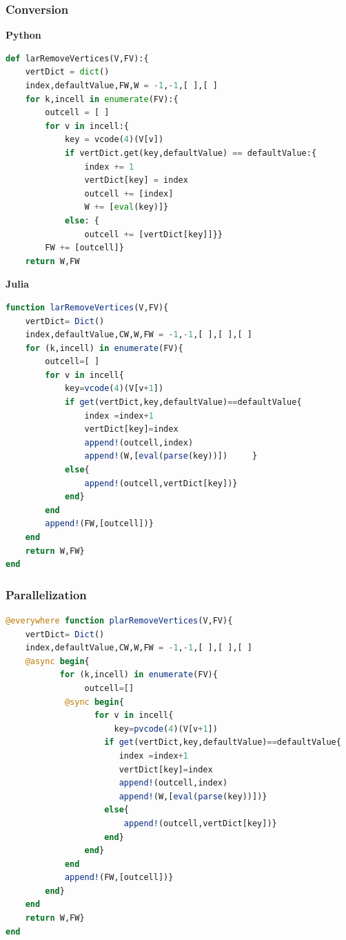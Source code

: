 \documentclass[a4paper,12pt]{article}
\begin{document}
\subsubsection{Conversion}
\textbf{Python}
\begin{lstlisting}[language=Python,format=Julia]
def larRemoveVertices(V,FV):{
    vertDict = dict()
    index,defaultValue,FW,W = -1,-1,[ ],[ ]        
    for k,incell in enumerate(FV):{
        outcell = [ ]
        for v in incell:{
            key = vcode(4)(V[v])
            if vertDict.get(key,defaultValue) == defaultValue:{
                index += 1
                vertDict[key] = index
                outcell += [index]
                W += [eval(key)]}
            else: {
                outcell += [vertDict[key]]}}
        FW += [outcell]}
    return W,FW
\end{lstlisting}
\textbf{Julia}
\begin{lstlisting}[language=Julia,format=Julia]
function larRemoveVertices(V,FV){
	vertDict= Dict()
	index,defaultValue,CW,W,FW = -1,-1,[ ],[ ],[ ]
	for (k,incell) in enumerate(FV){
		outcell=[ ]
		for v in incell{
			key=vcode(4)(V[v+1])
			if get(vertDict,key,defaultValue)==defaultValue{
				index =index+1
				vertDict[key]=index
				append!(outcell,index)
				append!(W,[eval(parse(key))])     }              
			else{
				append!(outcell,vertDict[key])}
			end}
		end
		append!(FW,[outcell])}
	end
	return W,FW}
end
\end{lstlisting}
\subsubsection{Parallelization}
\begin{lstlisting}[language=Julia,format=Julia]
@everywhere function plarRemoveVertices(V,FV){
	vertDict= Dict()
	index,defaultValue,CW,W,FW = -1,-1,[ ],[ ],[ ]
	@async begin{
	       for (k,incell) in enumerate(FV){
	       	   	outcell=[]
			@sync begin{
			      for v in incell{
			      	  key=pvcode(4)(V[v+1])
					if get(vertDict,key,defaultValue)==defaultValue{
				   	   index =index+1
				   	   vertDict[key]=index
				   	   append!(outcell,index)
				   	   append!(W,[eval(parse(key))])}
					else{
						append!(outcell,vertDict[key])}
					end}
				end}
			end
			append!(FW,[outcell])}
		end}
	end
	return W,FW}
end
\end{lstlisting}
\end{document}
